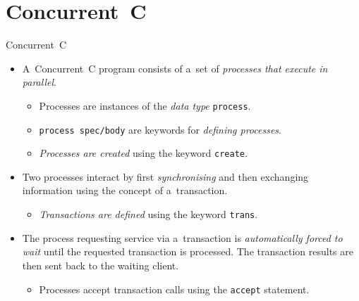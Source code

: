 \documentclass[
    10pt, hyperref={unicode, colorlinks, hypertexnames=false,
    linkcolor=white}, aspectratio=169
]{beamer}
\begin{document}
\section{Concurrent~C}
\begin{frame}{Concurrent~C}
    \begin{itemize}\setlength\itemsep{2.5em}
        \item
            A~\alert{Concurrent~C} program consists of a~set of
            \emph{processes that execute in parallel}.

            \begin{itemize}\setlength\itemsep{.5em}
                \item
                    Processes are instances of the \emph{data type}
                    \texttt{process}.

                \item
                    \texttt{process spec/body} are keywords for \emph{defining
                    processes}.

                \item
                    \emph{Processes are created} using the keyword \texttt{create}.
            \end{itemize}

        \item
            Two processes interact by first \emph{synchronising}
            and then exchanging information using the concept of
            a~\alert{transaction}.

            \begin{itemize}
                \item
                    \emph{Transactions are defined} using the keyword
                    \texttt{trans}.
            \end{itemize}

        \item
            The process requesting service via a~\alert{transaction} is
            \emph{automatically forced to wait} until the requested
            transaction is processed. The transaction results are then
            sent back to the waiting client.

            \begin{itemize}\setlength\itemsep{.5em}
                \item
                    Processes \alert{accept transaction calls} using the
                    \texttt{accept} statement. %

            \end{itemize}
    \end{itemize}
\end{frame}
\end{document}
